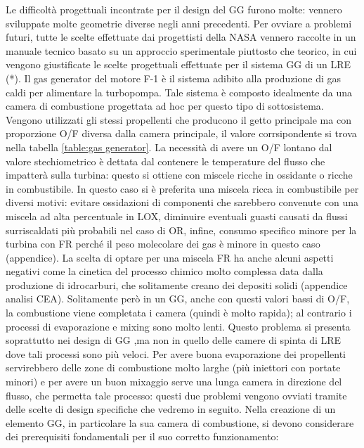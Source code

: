 \documentclass[11pt,a4paper]{article}
\begin{document}
\label{sec:gas generator}

Le difficoltà progettuali incontrate per il design del GG furono molte: vennero sviluppate molte geometrie diverse negli anni precedenti. Per ovviare a problemi futuri, tutte le scelte effettuate dai progettisti della NASA vennero raccolte in un manuale tecnico basato su un approccio sperimentale piuttosto che teorico, in cui vengono giustificate le scelte progettuali effettuate per il sistema GG di un LRE (*).
Il gas generator del motore F-1 è il sistema adibito alla produzione di gas caldi per alimentare la turbopompa. Tale sistema è composto idealmente da una camera di combustione progettata ad hoc per questo tipo di sottosistema. Vengono utilizzati gli stessi propellenti che producono il getto principale ma con proporzione O/F diversa dalla camera principale, il valore corrsipondente si trova nella tabella \ref{table:gas generator}. La necessità di avere un O/F lontano dal valore stechiometrico è dettata dal contenere le temperature del flusso che impatterà sulla turbina: questo si ottiene con miscele ricche in ossidante o ricche in combustibile. In questo caso si è preferita una miscela ricca in combustibile per diversi motivi: evitare ossidazioni di componenti che sarebbero convenute con una miscela ad alta percentuale in LOX, diminuire eventuali guasti causati da flussi surriscaldati più probabili nel caso di OR, infine, consumo specifico minore per la turbina con FR perché il peso molecolare dei gas è minore in questo caso (appendice). La scelta di optare per una miscela FR ha anche alcuni aspetti negativi come la cinetica del processo chimico molto complessa data dalla produzione di idrocarburi, che solitamente creano dei depositi solidi (appendice analisi CEA). Solitamente però in un GG, anche con questi valori bassi di O/F,  la combustione viene completata i camera (quindi è molto rapida); al contrario i processi di evaporazione e mixing sono molto lenti. Questo problema si presenta soprattutto nei design di GG ,ma non in quello delle camere di spinta di LRE dove tali processi sono più veloci. Per avere buona evaporazione dei propellenti servirebbero delle zone di combustione molto larghe (più iniettori con portate minori) e per avere un buon mixaggio serve una lunga camera in direzione del flusso, che permetta tale processo: questi due problemi vengono ovviati tramite delle scelte di design specifiche che vedremo in seguito. 
Nella creazione di un elemento GG, in particolare la sua camera di combustione, si devono considerare dei prerequisiti fondamentali per il suo corretto funzionamento:
\end{document}
